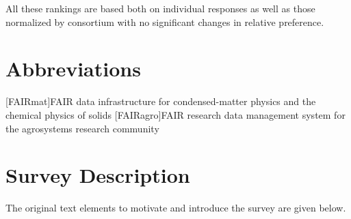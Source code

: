 \documentclass[headsepline,titlepage,twoside,12pt,toc=flat,headings=normal]{scrreprt}
\begin{document}
All these rankings are based both on individual responses as well as those normalized by consortium with no significant changes in relative preference.


\chapter*{Abbreviations}%

\begin{acronym}
[FAIRmat]{FAIR data infrastructure for condensed-matter physics and the chemical physics of solids}
[FAIRagro]{FAIR research data management system for the agrosystems research community}
\end{acronym}

\setcounter{tocdepth}{1}%
\tableofcontents
{}
\listoffigures
{}
\listoftables
{}


\chapter{Survey Description}\label{ch:questionnaire}
The original text elements to motivate and introduce the survey are given below.
\end{document}
